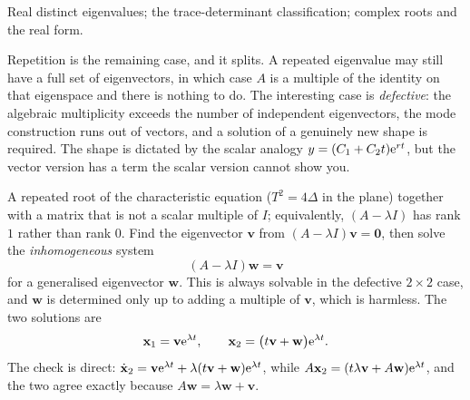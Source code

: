 \begin{seealsob}Real distinct eigenvalues; the trace-determinant classification; complex roots and the real form.\end{seealsob}

Repetition is the remaining case, and it splits. A repeated eigenvalue may still have a full set of eigenvectors, in which case $A$ is a multiple of the identity on that eigenspace and there is nothing to do. The interesting case is \emph{defective}: the algebraic multiplicity exceeds the number of independent eigenvectors, the mode construction runs out of vectors, and a solution of a genuinely new shape is required. The shape is dictated by the scalar analogy $y=(C_1+C_2t)\mathrm{e}^{rt}$, but the vector version has a term the scalar version cannot show you.

\cue A repeated root of the characteristic equation ($T^{2}=4\Delta$ in the plane) together with a matrix that is not a scalar multiple of $I$; equivalently, $(A-\lambda I)$ has rank $1$ rather than rank $0$.
\method Find the eigenvector $\mathbf{v}$ from $(A-\lambda I)\mathbf{v}=\mathbf{0}$, then solve the \emph{inhomogeneous} system
\[(A-\lambda I)\mathbf{w}=\mathbf{v}\]
for a generalised eigenvector $\mathbf{w}$. This is always solvable in the defective $2\times2$ case, and $\mathbf{w}$ is determined only up to adding a multiple of $\mathbf{v}$, which is harmless. The two solutions are
\[\mathbf{x}_1=\mathbf{v}\mathrm{e}^{\lambda t},\qquad \mathbf{x}_2=\bigl(t\mathbf{v}+\mathbf{w}\bigr)\mathrm{e}^{\lambda t}.\]
The check is direct: $\dot{\mathbf{x}}_2=\mathbf{v}\mathrm{e}^{\lambda t}+\lambda(t\mathbf{v}+\mathbf{w})\mathrm{e}^{\lambda t}$, while $A\mathbf{x}_2=(t\lambda\mathbf{v}+A\mathbf{w})\mathrm{e}^{\lambda t}$, and the two agree exactly because $A\mathbf{w}=\lambda\mathbf{w}+\mathbf{v}$.

